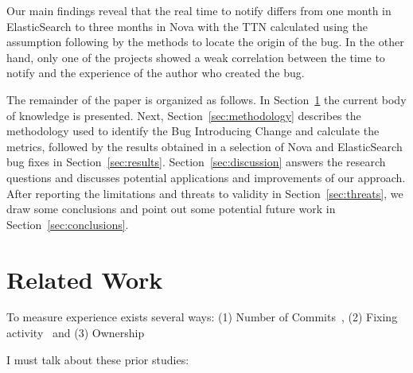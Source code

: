 \documentclass[10pt, conference]{IEEEtran}
\begin{document}
Our main findings reveal that the real time to notify differs from one month in ElasticSearch to three months in Nova with the TTN calculated using the assumption following by the methods to locate the origin of the bug. In the other hand, only one of the projects showed a weak correlation between the time to notify and the experience of the author who created the bug.

The remainder of the paper is organized as follows. In Section~\ref{sec:relatedwork} the current body of knowledge is presented. Next, Section~\ref{sec:methodology} describes the methodology used to identify the Bug Introducing Change and calculate the metrics, followed by the results obtained in a selection of Nova and ElasticSearch bug fixes in Section~\ref{sec:results}. Section~\ref{sec:discussion} answers the research questions and discusses potential applications and improvements of our approach. After reporting the limitations and threats to validity in Section~\ref{sec:threats}, we draw some conclusions and point out some potential future work in Section~\ref{sec:conclusions}.

\section{Related Work}
\label{sec:relatedwork}

To measure experience exists several ways: (1) Number of Commits~\cite{eyolfson2011time}, (2) Fixing activity~\cite{ahsan2010mining} and (3) Ownership~\cite{german2004using}

I must talk about these prior studies: \\
\end{document}
